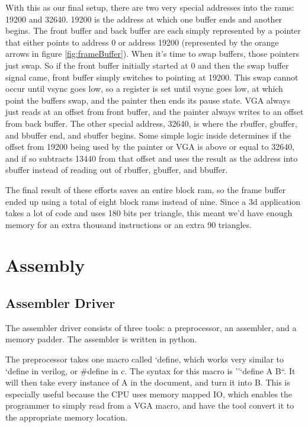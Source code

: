 \documentclass[onecolumn]{IEEEtran}
\begin{document}
With this as our final setup, there are two very special addresses into the rams: 19200 and 32640.  19200 is the address at which one buffer ends and another begins.  The front buffer and back buffer are each simply represented by a pointer that either points to address 0 or address 19200 (represented by the orange arrows in figure \ref{fig:frameBuffer}).  When it's time to swap buffers, those pointers just swap.  So if the front buffer initially started at 0 and then the swap buffer signal came, front buffer simply switches to pointing at 19200.  This swap cannot occur until vsync goes low, so a register is set until vsync goes low, at which point the buffers swap, and the painter then ends its pause state.  VGA always just reads at an offset from front buffer, and the painter always writes to an offset from back buffer.  The other special address, 32640, is where the rbuffer, gbuffer, and bbuffer end, and sbuffer begins.  Some simple logic inside determines if the offset from 19200 being used by the painter or VGA is above or equal to 32640, and if so subtracts 13440 from that offset and uses the result as the address into sbuffer instead of reading out of rbuffer, gbuffer, and bbuffer.

The final result of these efforts saves an entire block ram, so the frame buffer ended up using a total of eight block rams instead of nine.  Since a 3d application takes a lot of code and uses 180 bits per triangle, this meant we'd have enough memory for an extra thousand instructions or an extra 90 triangles.

\section{Assembly}
\subsection{Assembler Driver}
The assembler driver consists of three tools: a preprocessor, an assembler, and a memory padder. The assembler is written in python.

The preprocessor takes one macro called `define, which works very similar to `define in verilog, or \#define in c.   The syntax for this macro is ''`define A B``. It will then take every instance of A in the document, and turn it into B.  This is especially useful because the CPU uses memory mapped IO, which enables the programmer to simply read from a VGA macro, and have the tool convert it to the appropriate memory location.
\end{document}
